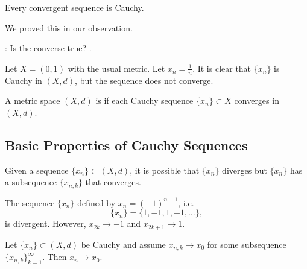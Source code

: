 \documentclass[notoc,notitlepage]{tufte-book}
\begin{document}
\begin{thm}\label{thm:convergent_sequences_are_cauchy}
  Every convergent sequence is Cauchy.
\end{thm}

We proved this in our observation.

: Is the converse true? .

\begin{eg}
  Let $X = (0, 1)$ with the usual metric. Let $x_n = \frac{1}{n}$. It is clear that $\{ x_n \}$ is Cauchy in $(X, d)$, but the sequence does not converge.
\end{eg}

\begin{defn}\label{defn:complete_metric_spaces}
  A metric space $(X, d)$ is  if each Cauchy sequence $\{ x_n \} \subset X$ converges in $(X, d)$.
\end{defn}

\subsection{Basic Properties of Cauchy Sequences}%
\label{sub:basic_properties_of_cauchy_sequences}

 Given a sequence $\{ x_n \} \subset (X, d)$, it is possible that $\{ x_n \}$ diverges but $\{ x_n \}$ has a subsequence $\{ x_{n, k} \}$ that converges.

\begin{eg}
  The sequence $\{ x_n \}$ defined by $x_n = (-1)^{n - 1}$, i.e. 
  \begin{equation*}
    \{ x_n \} = \{ 1, -1, 1, -1, \ldots \},
  \end{equation*}
  is divergent. However, $x_{2k} \to -1$ and $x_{2k + 1} \to 1$.
\end{eg}

\begin{thm}\label{thm:convergent_cauchy_subsequences}
  Let $\{ x_n \} \subset (X, d)$ be Cauchy and assume $x_{n, k} \to x_0$ for some subsequence $\{ x_{n, k} \}_{k = 1}^{\infty}$. Then $x_n \to x_0$.
\end{thm}
\end{document}
